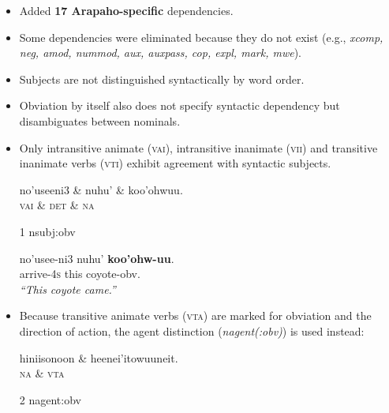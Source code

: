 \documentclass[portrait,a0paper,fontscale=0.36]{baposter} %
\newcommand{\compresslist}{ %
\setlength{\itemsep}{1pt}
\setlength{\parskip}{0pt}
\setlength{\parsep}{0pt}
}
\begin{document}
\begin{poster}
{\begin{itemize}
\normalsize
\item Added  \textbf{17 Arapaho-specific} dependencies.
\item Some dependencies were eliminated because they do not exist (e.g., \textit{xcomp, neg, amod, nummod, aux, auxpass, cop, expl, mark, mwe}).
\end{itemize}
}
{
\begin{itemize}\compresslist
\item Subjects are not distinguished syntactically by word order. 
\item Obviation by itself also does not specify syntactic dependency but disambiguates between nominals.
\item Only intransitive animate (\textsc{vai}), intransitive inanimate (\textsc{vii}) and transitive inanimate verbs (\textsc{vti}) exhibit agreement with syntactic subjects. 
\small
\begin{exe}
\ex \label{nsubj:obv} %
\begin{dependency}
\begin{deptext}
no'useeni3 \& nuhu' \& koo'ohwuu.\\
\textsc{vai} \& \textsc{det} \& \textsc{na}\\
\end{deptext}
	{1}	{nsubj:obv}
\end{dependency}
\gll no'usee-ni3 nuhu' \textbf{koo'ohw-uu}.\\
{arrive-\textsc{4s}} this coyote-obv.\\
\trans \textit{``This coyote came.''}
\end{exe}
\normalsize
\item Because transitive animate verbs (\textsc{vta}) are marked for obviation and the direction of action, the agent distinction (\textit{nagent(:obv)}) is used instead:
\small
\begin{exe}
\ex \label{agent:obv}%
\begin{dependency}
\begin{deptext}
hiniisonoon \& heenei'itowuuneit.\\
\textsc{na} \& \textsc{vta}\\
\end{deptext}
	{2}	{nagent:obv}

\end{dependency}
\end{exe}
\end{itemize}}
\end{poster}
\end{document}
